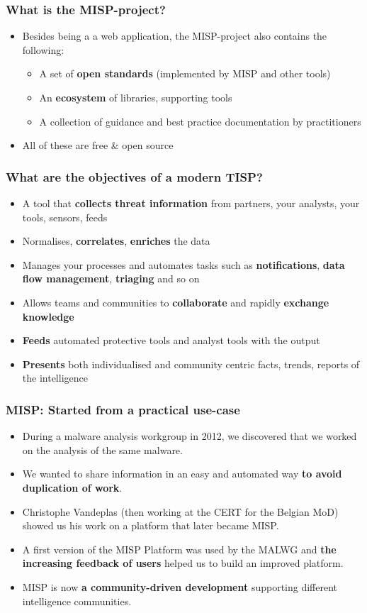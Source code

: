 \begin{frame}
\frametitle{What is the MISP-project?}
\begin{itemize}
        \item Besides being a a web application, the MISP-project also contains the following:
        \begin{itemize}
            \item A set of {\bf open standards} (implemented by MISP and other tools)
            \item An {\bf ecosystem} of libraries, supporting tools
            \item A collection of guidance and best practice documentation by practitioners
        \end{itemize}
        \item All of these are free \& open source
\end{itemize}
\end{frame}

\begin{frame}
\frametitle{What are the objectives of a modern TISP?}      
\begin{itemize}
       \item A tool that {\bf collects threat information} from partners, your analysts, your tools, sensors, feeds
       \item Normalises, {\bf correlates}, {\bf enriches} the data
       \item Manages your processes and automates tasks such as {\bf notifications}, {\bf data flow management}, {\bf triaging} and so on
       \item Allows teams and communities to {\bf collaborate} and rapidly {\bf exchange knowledge}
       \item {\bf Feeds} automated protective tools and analyst tools with the output
       \item {\bf Presents} both individualised and community centric facts, trends, reports of the intelligence
\end{itemize}
\end{frame}


\begin{frame}
 \frametitle{MISP: Started from a practical use-case}
 \begin{itemize}
         \item During a malware analysis workgroup in 2012, we discovered that we worked on the analysis of the same malware.
         \item We wanted to share information in an easy and automated way {\bf to avoid duplication of work}.
         \item Christophe Vandeplas (then working at the CERT for the Belgian MoD) showed us his work on a platform that later became MISP.
         \item A first version of the MISP Platform was used by the MALWG and {\bf the increasing feedback of users} helped us to build an improved platform.
         \item MISP is now {\bf a community-driven development} supporting different intelligence communities.
 \end{itemize}
\end{frame}


